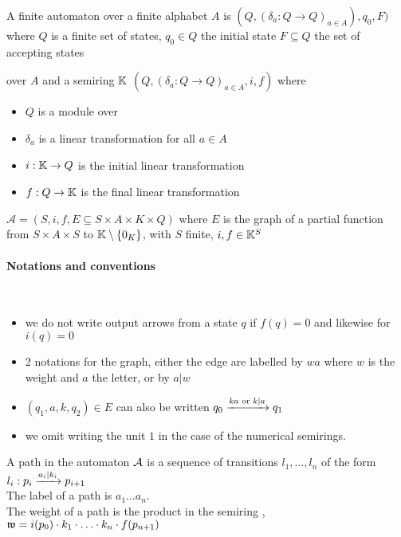\begin{definition}
	A finite automaton over a finite alphabet $A$ is
	$(Q, (\delta_a: Q\to Q)_{a\in A}), q_0, F)$
	where $Q$ is a finite set of states, $q_0 \in Q$ the initial state
	$F \subseteq Q$ the set of accepting states
\end{definition}

\begin{definition} over $A$ and a semiring $\mathbb{K}$
	$(Q, (\delta_a: Q\to Q)_{a\in A}, i, f)$ where 
	\begin{itemize}
		\item $Q$ is a module over \KK
		\item $\delta_a$ is a linear transformation for all $a\in A$
		\item $i : \mathbb{K} \to Q$ is the initial linear transformation
		\item $f : Q \to \mathbb{K}$ is the final linear transformation
	\end{itemize}
\end{definition}

\begin{definition}
	$\mathcal{A}=(S, i, f, E \subseteq S \times A \times K \times Q)$ 
	where $E$ is
	the graph of a partial function from $S\times A \times S$ to $\mathbb{K}\setminus
	\{0_K\}$, with $S$ finite, $i, f\in \mathbb{K}^S$
\end{definition}

\paragraph{Notations and conventions}~
\begin{itemize}
	\item we do not write output arrows from a state $q$ if $f(q) = 0$
		and likewise for $i(q) = 0$
	\item 2 notations for the graph, either the edge are labelled by $wa$
		where $w$ is the weight and $a$ the letter, or by $a | w$
	\item $(q_1, a, k, q_2) \in E$ can also be written
		$q_0 \xrightarrow{ka\text{ or }k|a} q_1$
	\item we omit writing the unit $1$ in the case of the numerical semirings.
\end{itemize}
\begin{definition}[path] A path in the automaton  $\mathcal{A}$ is a sequence of
	transitions $l_1, \ldots, l_n$ of the form 
	$l_i : p_i \xrightarrow{a_i | k_i} p_{i+1}$\\
	The label of a path is $a_1\ldots a_n$.\\
	The weight of a path is the product in the semiring \KK,
	$\operatorname{\mathfrak{w}} = i(p_0) \cdot k_1 \cdot \ldots \cdot k_n \cdot f(p_{n+1})$
\end{definition}

